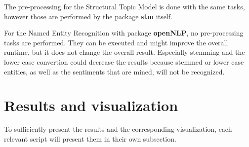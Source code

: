 \documentclass[10pt,a4paper]{article}
\begin{document}
	The pre-processing for the Structural Topic Model is done with the same tasks, however those are performed by the package \textbf{stm} itself.
	
	For the Named Entity Recognition with package \textbf{openNLP}, no pre-processing tasks are performed. They can be executed and might improve the overall runtime, but it does not change the overall result. Especially stemming and the lower case convertion could decrease the results because stemmed or lower case entities, as well as the sentiments that are mined, will not be recognized.

	
	
	\section{Results and visualization}
	
	To sufficiently present the results and the corresponding visualization, each relevant script will present them in their own subsection.
	
\end{document}
